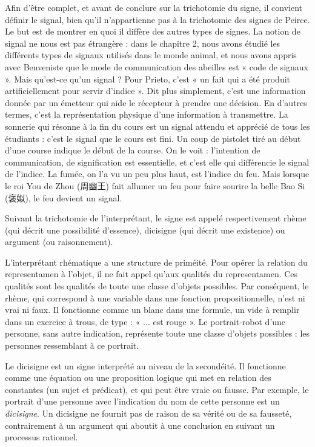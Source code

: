 Afin d’être complet, et avant de conclure sur la trichotomie du signe, il convient définir le signal, bien qu’il n’appartienne pas à la trichotomie des signes de Peirce. Le but est de montrer en quoi il diffère des autres types de signes. La notion de signal ne nous est pas étrangère : dans le chapitre 2, nous avons étudié les différents types de signaux utilisés dans le monde animal, et nous avons appris avec Benveniste que le mode de communication des abeilles est « code de signaux ». Mais qu’est-ce qu’un signal ? Pour Prieto, c’est « un fait qui a été produit artificiellement pour servir d’indice ». Dit plus simplement, c’est une information donnée par un émetteur qui aide le récepteur à prendre une décision. En d’autres termes, c’est la représentation physique d’une information à transmettre. La sonnerie qui résonne à la fin du cours est un signal attendu et apprécié de tous les étudiants : c’est le signal que le cours est fini. Un coup de pistolet tiré au début d’une course indique le début de la course. On le voit : l’intention de communication, de signification est essentielle, et c’est elle qui différencie le signal de l’indice. La fumée, on l’a vu un peu plus haut, est l’indice du feu. Mais lorsque le roi You de Zhou (周幽王) fait allumer un feu pour faire sourire la belle Bao Si (褒姒), le feu devient un signal.

Suivant la trichotomie de l’interprétant, le signe est appelé respectivement rhème (qui décrit une possibilité d’essence), dicisigne (qui décrit une existence) ou argument (ou raisonnement).

L’interprétant rhématique a une structure de priméité. Pour opérer la relation du representamen à l’objet, il ne fait appel qu’aux qualités du representamen. Ces qualités sont les qualités de toute une classe d’objets possibles. Par conséquent, le rhème, qui correspond à une variable dans une fonction propositionnelle, n’est ni vrai ni faux. Il fonctionne comme un blanc dans une formule, un vide à remplir dans un exercice à trous, de type : « ... est rouge ». Le portrait-robot d’une personne, sans autre indication, représente toute une classe d’objets possibles : les personnes ressemblant à ce portrait.

Le dicisigne est un signe interprété au niveau de la secondéité. Il fonctionne comme une équation ou une proposition logique qui met en relation des constantes (un sujet et prédicat), et qui peut être vraie ou fausse. Par exemple, le portrait d’une personne avec l’indication du nom de cette personne est un \textit{dicisigne}. Un dicisigne ne fournit pas de raison de sa vérité ou de sa fausseté, contrairement à un argument qui aboutit à une conclusion en suivant un processus rationnel.

